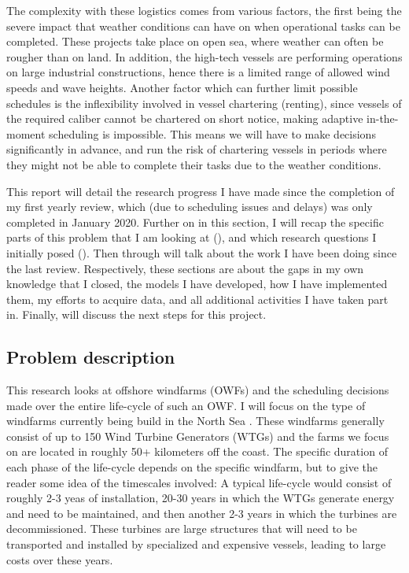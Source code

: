 \documentclass[a4paper,12pt]{article}
\begin{document}
The complexity with these logistics comes from various factors, the first being the severe impact that weather conditions can have on when operational tasks can be completed. These projects take place on open sea, where weather can often be rougher than on land. In addition, the high-tech vessels are performing operations on large industrial constructions, hence there is a limited range of allowed wind speeds and wave heights. Another factor which can further limit possible schedules is the inflexibility involved in vessel chartering (renting), since vessels of the required caliber cannot be chartered on short notice, making adaptive in-the-moment scheduling is impossible. This means we will have to make decisions significantly in advance, and run the risk of chartering vessels in periods where they might not be able to complete their tasks due to the weather conditions. 

This report will detail the research progress I have made since the completion of my first yearly review, which (due to scheduling issues and delays) was only completed in January 2020. Further on in this section, I will recap the specific parts of this problem that I am looking at (), and which research questions I initially posed (). Then  through   will talk about the work I have been doing since the last review. Respectively, these sections are about the gaps in my own knowledge that I closed, the models I have developed, how I have implemented them, my efforts to acquire data, and all additional activities I have taken part in. Finally,  will discuss the next steps for this project. 

\subsection{Problem description} \label{ss:prob}
This research looks at offshore windfarms (OWFs) and the scheduling decisions made over the entire life-cycle of such an OWF. I will focus on the type of windfarms currently being build in the North Sea \cite{ruk2017,barlow2018mixed}. These windfarms generally consist of up to 150 Wind Turbine Generators (WTGs) and the farms we focus on are located in roughly 50+ kilometers off the coast. The specific duration of each phase of the life-cycle depends on the specific windfarm, but to give the reader some idea of the timescales involved: A typical life-cycle would consist of roughly 2-3 yeas of installation, 20-30 years in which the WTGs generate energy and need to be maintained, and then another 2-3 years in which the turbines are decommissioned. These turbines are large structures that will need to be transported and installed by specialized and expensive vessels, leading to large costs over these years. 
\end{document}
